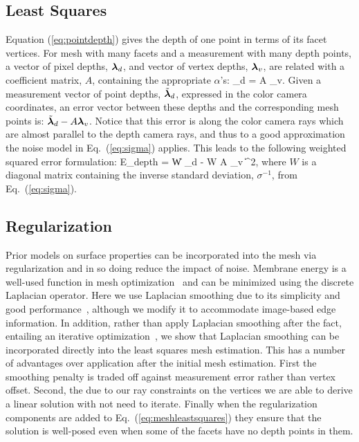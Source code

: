 \subsection{Least Squares}

Equation (\ref{eq:pointdepth}) gives the depth of one point in terms of its facet vertices.  For mesh with many facets and a measurement with many depth points, a vector of pixel depths, $\boldsymbol{\lambda}_d$, and vector of vertex depths, $\boldsymbol{\lambda}_v$, are related with a coefficient matrix, $A$, containing the appropriate $\alpha$'s:
\beq
\vlambda_d = A \vlambda_v. \label{eq:linearmesh}
\eeq
Given a measurement vector of point depths, $\tilde{\boldsymbol{\lambda}}_d$, expressed in the color camera coordinates, an error vector between these depths and the corresponding mesh points is: $\tilde{\boldsymbol{\lambda}}_d - A \boldsymbol{\lambda}_v$.  Notice that this error is along the color camera rays which are almost parallel to the depth camera rays, and thus to a good approximation the noise model in Eq.~(\ref{eq:sigma}) applies.  This leads to the following weighted squared error formulation:
\beq
E_{depth} = \| W \tilde{\vlambda}_d - W A \vlambda_v \|^2, \label{eq:meshleastsquares}
\eeq
where $W$ is a diagonal matrix containing the inverse standard deviation, $\sigma^{-1}$, from Eq.~(\ref{eq:sigma}).

\subsection{Regularization}

Prior models on surface properties can be incorporated into the mesh via regularization and in so doing reduce the impact of noise.  Membrane energy is a well-used function in mesh optimization~\cite{Kobbelt:1998} and can be minimized using the discrete Laplacian operator.  Here we use Laplacian smoothing due to its simplicity and good performance~\cite{Kobbelt:1998,Ohtake2001789,Chen2005376}, although we modify it to accommodate image-based edge information.  In addition, rather than apply Laplacian smoothing after the fact, entailing an iterative optimization~\cite{Kobbelt:1998}, we show that Laplacian smoothing can be incorporated directly into the least squares mesh estimation.  This has a number of  advantages over application after the initial mesh estimation.  First the smoothing penalty is traded off against measurement error rather than vertex offset.  Second, the due to our ray constraints on the vertices we are able to derive a linear solution with not need to iterate.  Finally  when the regularization components are added to Eq.~(\ref{eq:meshleastsquares}) they ensure that the solution is well-posed even when some of the facets have no depth points in them.

